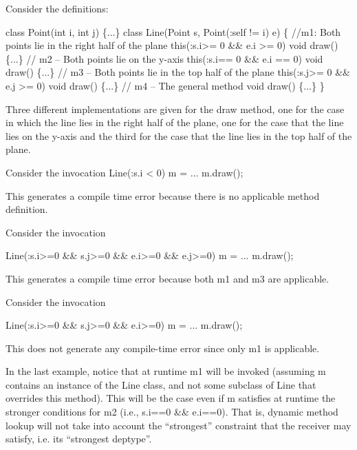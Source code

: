 \begin{example}
  Consider the definitions:
  \begin{x10}
class Point(int i, int j) \{...\}
class Line(Point s, Point(:self != i) e) \{
//m1: Both points lie in the right half of the plane
  this(:s.i>= 0 \&\& e.i >= 0) void draw() \{...\}
// m2 -- Both points lie on the y-axis
  this(:s.i== 0 \&\& e.i == 0) void draw() \{...\}
// m3 -- Both points lie in the top half of the plane
  this(:s.j>= 0 \&\& e.j >= 0) void draw() \{...\}
  // m4  -- The general method
  void draw() \{...\}
\} 
  \end{x10} 
\noindent  Three different implementations are given for the draw method, one
  for the case in which the line lies in the right half of the plane,
  one for the case that the line lies on the y-axis and the third for
  the case that the line lies in the top half of the plane.


\noindent  Consider the invocation
Line(:s.i < 0) m = ...
m.draw();

\noindent  This generates a compile time error because there is no applicable
  method definition.

\noindent  Consider the invocation

\begin{x10}
Line(:s.i>=0 \&\& s.j>=0 \&\& e.i>=0 \&\& e.j>=0) 
  m = ...
m.draw();
\end{x10}

\noindent  This generates a compile time error because both m1 and m3 are applicable.

\noindent  Consider the invocation
\begin{x10}
Line(:s.i>=0 \&\& s.j>=0 \&\& e.i>=0) m = ...
m.draw();
\end{x10}
  This does not generate any compile-time error since only m1 is
  applicable. 
\end{example}


In the last example, notice that at runtime {\cf m1} will be invoked
(assuming {\cf m} contains an instance of the {\cf Line} class, and not some
subclass of {\cf Line} that overrides this method). This will be the case
even if {\cf m} satisfies at runtime the stronger conditions for {\cf m2} (i.e.,
{\cf s.i==0 \&\& e.i==0}). That is, dynamic method lookup will not take into
account the  ``strongest'' constraint that the receiver may satisfy, i.e.{}
its ``strongest deptype''. 

